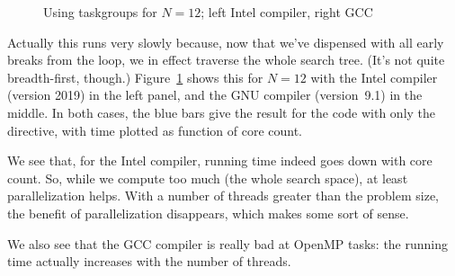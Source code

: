 \begin{figure}[ht]
  \pgfplotsset{width=4in,compat=1.7}
  \hbox\bgroup %
  \egroup  %
  \caption{Using taskgroups for $N=12$; left Intel compiler, right GCC}
  \label{fig:omp-dfs}
\end{figure}

Actually this runs very slowly because,
now that we've dispensed with all early breaks from the loop,
we in effect traverse the whole search tree.
(It's not quite breadth-first, though.)
%
Figure~\ref{fig:omp-dfs} shows this for $N=12$
with the Intel compiler (version 2019) in the left panel,
and the GNU compiler (version~9.1) in the middle.
In both cases,  the blue bars give the result for the code
with only the  directive,
with time plotted as function of core count.

We see that, for the Intel compiler, running time indeed
goes down with core count.
So, while we compute too much (the whole search space),
at least parallelization helps.
With a number of threads greater than the problem size,
the benefit of parallelization disappears,
which makes some sort of sense.

We also see that the GCC compiler is really bad at OpenMP tasks:
the running time actually increases with the number of threads.

